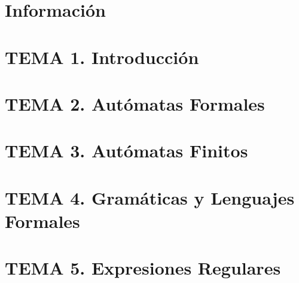 \documentclass[12pt, twoside, openright]{report} %
\begin{document}





\part{Información}



\part{TEMA 1. Introducción}


\part{TEMA 2. Autómatas Formales}



\part{TEMA 3. Autómatas Finitos}








\part{TEMA 4. Gramáticas y Lenguajes Formales}








\part{TEMA 5. Expresiones Regulares}




\end{document}
